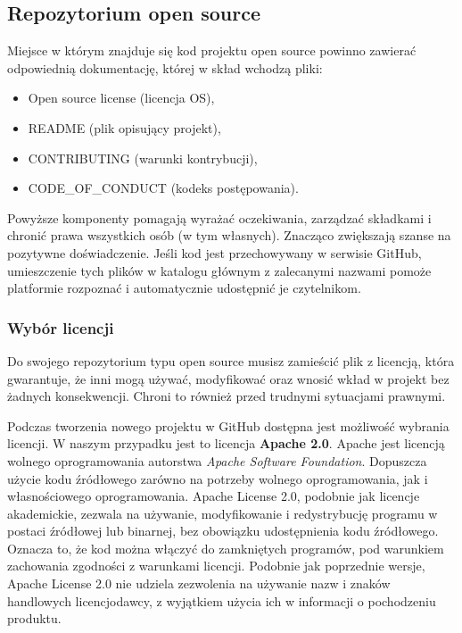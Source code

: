 \documentclass{article}
\begin{document}
\subsection{Repozytorium open source}

\hspace{4mm} Miejsce w którym znajduje się kod projektu open source powinno zawierać odpowiednią dokumentację, której w skład wchodzą pliki:
\begin{itemize}
    \item Open source license (licencja OS),
    \item README (plik opisujący projekt),
    \item CONTRIBUTING (warunki kontrybucji),
    \item CODE\_OF\_CONDUCT (kodeks postępowania).
\end{itemize}
Powyższe komponenty pomagają wyrażać oczekiwania, zarządzać składkami i chronić prawa wszystkich osób (w tym własnych). Znacząco zwiększają szanse na pozytywne doświadczenie. Jeśli kod jest przechowywany w serwisie GitHub, umieszczenie tych plików w katalogu głównym z zalecanymi nazwami pomoże platformie rozpoznać i automatycznie udostępnić je czytelnikom\cite{opensource.guide}.

\subsubsection{Wybór licencji}

\hspace{4mm} Do swojego repozytorium typu open source musisz zamieścić plik z licencją, która gwarantuje, że inni mogą używać, modyfikować oraz wnosić wkład w projekt bez żadnych konsekwencji. Chroni to również przed trudnymi sytuacjami prawnymi\cite{opensource.guide}. 

Podczas tworzenia nowego projektu w GitHub dostępna jest możliwość wybrania licencji. W naszym przypadku jest to licencja \textbf{Apache 2.0}. Apache jest licencją wolnego oprogramowania autorstwa \emph{Apache Software Foundation}. Dopuszcza użycie kodu źródłowego zarówno na potrzeby wolnego oprogramowania, jak i własnościowego oprogramowania. Apache License 2.0, podobnie jak licencje akademickie, zezwala na używanie, modyfikowanie i redystrybucję programu w postaci źródłowej lub binarnej, bez obowiązku udostępnienia kodu źródłowego. Oznacza to, że kod można włączyć do zamkniętych programów, pod warunkiem zachowania zgodności z warunkami licencji. Podobnie jak poprzednie wersje, Apache License 2.0 nie udziela zezwolenia na używanie nazw i znaków handlowych licencjodawcy, z wyjątkiem użycia ich w informacji o pochodzeniu produktu\cite{apache}.
\end{document}
